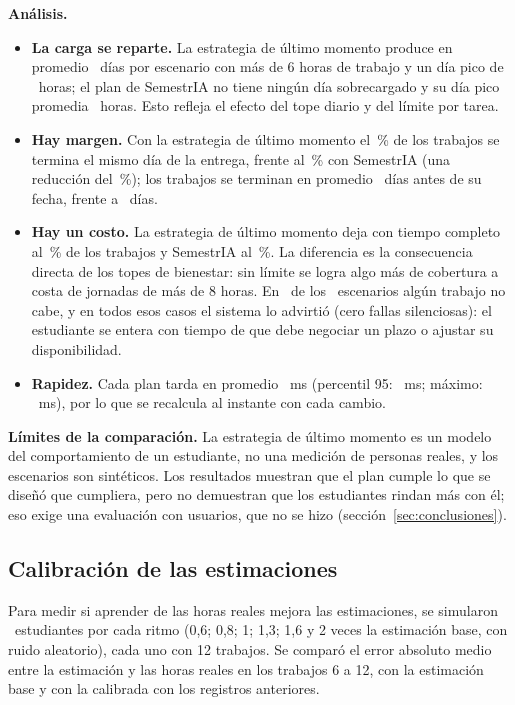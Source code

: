 \textbf{Análisis.}
\begin{itemize}
    \item \textbf{La carga se reparte.} La estrategia de último momento produce en promedio \resDiasSobreUlt\ días por escenario con más de 6 horas de trabajo y un día pico de \resMaxUlt\ horas; el plan de SemestrIA no tiene ningún día sobrecargado y su día pico promedia \resMaxEdf\ horas. Esto refleja el efecto del tope diario y del límite por tarea.
    \item \textbf{Hay margen.} Con la estrategia de último momento el \resColUlt\,\% de los trabajos se termina el mismo día de la entrega, frente al \resColEdf\,\% con SemestrIA (una reducción del \resRedCol\,\%); los trabajos se terminan en promedio \resAntEdf\ días antes de su fecha, frente a \resAntUlt\ días.
    \item \textbf{Hay un costo.} La estrategia de último momento deja con tiempo completo al \resPctCubUlt\,\% de los trabajos y SemestrIA al \resPctCub\,\%. La diferencia es la consecuencia directa de los topes de bienestar: sin límite se logra algo más de cobertura a costa de jornadas de más de 8 horas. En \resConAdv\ de los \resEscenarios\ escenarios algún trabajo no cabe, y en todos esos casos el sistema lo advirtió (cero fallas silenciosas): el estudiante se entera con tiempo de que debe negociar un plazo o ajustar su disponibilidad.
    \item \textbf{Rapidez.} Cada plan tarda en promedio \resMsMedia\ ms (percentil 95: \resMsPNov\ ms; máximo: \resMsMax\ ms), por lo que se recalcula al instante con cada cambio.
\end{itemize}

\textbf{Límites de la comparación.} La estrategia de último momento es un modelo del comportamiento de un estudiante, no una medición de personas reales, y los escenarios son sintéticos. Los resultados muestran que el plan cumple lo que se diseñó que cumpliera, pero no demuestran que los estudiantes rindan más con él; eso exige una evaluación con usuarios, que no se hizo (sección~\ref{sec:conclusiones}).

\subsection{Calibración de las estimaciones}\label{sec:calibracion}

Para medir si aprender de las horas reales mejora las estimaciones, se simularon \resUsuarios\ estudiantes por cada ritmo (0,6; 0,8; 1; 1,3; 1,6 y 2 veces la estimación base, con ruido aleatorio), cada uno con 12 trabajos. Se comparó el error absoluto medio entre la estimación y las horas reales en los trabajos 6 a 12, con la estimación base y con la calibrada con los registros anteriores.

